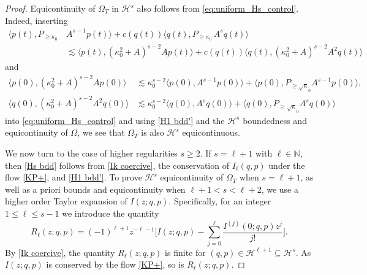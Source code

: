 \documentclass{amsart}
\newcommand{\N}{{\mathbb{N}}}
\theoremstyle{definition}
\numberwithin{equation}{section}
\renewcommand{\H}{\mathcal H}
\newcommand{\la}{\langle}
\newcommand{\ra}{\rangle}
\begin{document}
\begin{proof}
Equicontinuity of $\Omega_T$ in $\H^s$ also follows from \eqref{eq:uniform_Hs_control}.  Indeed, inserting
\begin{align*}
\langle p(t),P_{\geq  \kappa_0}\, &A^{s-1}p(t)\rangle + c(q(t))\langle q(t),P_{\geq  \kappa_0}\, A^s q(t)\rangle\\
&\lesssim \langle p(t), (\kappa_0^2+A)^{s-2} Ap(t)\rangle + c(q(t)) \langle q(t), (\kappa_0^2+A)^{s-2}  A^2q(t)\rangle
\end{align*}
and
\begin{align*}
\la p(0), (\kappa_0^2+A)^{s-2}A p(0)\ra &\lesssim \kappa_0^{s-2}\la p(0), A^{s-1}p(0)\ra + \la p(0), P_{\geq \sqrt \kappa_0} A^{s-1}p(0)\ra,\\
\la q(0), (\kappa_0^2+A)^{s-2}A^2 q(0)\ra &\lesssim  \kappa_0^{s-2}\la q(0), A^{s}q(0)\ra + \la q(0), P_{\geq \sqrt \kappa_0} A^{s}q(0)\ra
\end{align*}
into \eqref{eq:uniform_Hs_control} and using \eqref{H1 bdd'} and the $ \H^s$ boundedness and equicontinuity of $\Omega$, we see that $\Omega_T$ is also $ \H^s$ equicontinuous.

We now turn to the case of higher regularities $s\geq 2$. If $s=\ell+1$ with $\ell\in \N$, then \eqref{Hs bdd} follows from \eqref{Ik coercive}, the conservation of $I_{\ell}(q,p)$ under the flow \eqref{KP+}, and \eqref{H1 bdd'}. To prove $\H^s$ equicontinuity of $\Omega_T$ when $s=\ell+1$, as well as a priori bounds and equicontinuity when $\ell+1<s<\ell+2$, we use a higher order Taylor expansion of $I(z;q,p)$.  Specifically, for an integer $1\leq \ell\leq s-1$ we introduce the quantity
\begin{equation}\label{R}
R_\ell(z;q,p) = (-1)^{\ell+1} z^{-\ell-1}\biggl[I(z;q,p) -\sum_{j=0}^{\ell} \frac{I^{(j)}(0;q,p)z^j}{j!}\biggr].
\end{equation}
By \eqref{Ik coercive}, the quantity $R_\ell(z;q,p)$ is finite for $(q,p)\in \H^{\ell+1}\subseteq \H^s$.  As $I(z;q,p)$ is conserved by the flow \eqref{KP+}, so is $R_\ell(z;q,p)$.


\end{proof}
\end{document}
